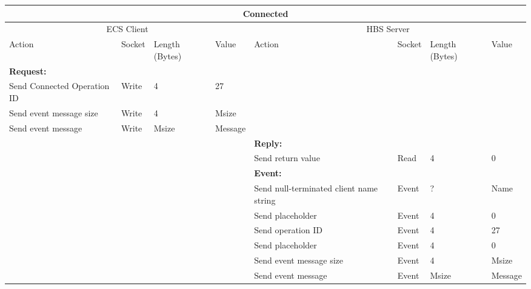 \bigskip
\small
\begin{tabular}{|p{1.2in}|p{.4in}|p{.4in}|p{.4in}|p{1.2in}|p{.4in}|p{.4in}|p{.4in} |} \hline
\multicolumn{8}{|c|}{{\bf Connected}} \\ \hline
\multicolumn{4}{|c|}{ECS Client} & \multicolumn{4}{|c|}{HBS Server} \\ \hline
Action            & Socket & Length (Bytes) 
                                   & Value & Action       & Socket & Length (Bytes) & Value \\ \hline
\multicolumn{4}{|l}{{\bf Request:}}&\multicolumn{4}{|l|}{~} \\ \hline
Send
Connected Operation ID        & Write  & 4     & 27    &              &        &       &       \\ \hline
Send event message
 size             & Write  & 4     &  Msize &         &        &       &       \\ \hline
Send event message
                  & Write  &  Msize  &  Message &     &        &       &       \\ \hline
\multicolumn{4}{|l}{~}&\multicolumn{4}{|l|}{{\bf Reply:}} \\ \hline
                  &        &       &       & Send return
                                             value        & Read   &  4    & 0      \\ \hline
\multicolumn{4}{|l}{~}&\multicolumn{4}{|l|}{{\bf Event:}} \\ \hline
                  &        &       &       & Send null-terminated client
                                             name string  & Event  &  ?    & Name  \\ \hline
                  &        &       &       & Send placeholder  & Event  &   4   &  0    \\  \hline
                  &        &       &       & Send operation 
                                             ID           & Event  &   4   &  27   \\ \hline
                  &        &       &       & Send placeholder     & Event  &   4   &  0    \\ \hline
                  &        &       &       & Send event message
                                                  size    & Event  &   4   &  Msize \\ \hline
                  &        &       &       & Send event message
                                                          & Event  &  Msize&  Message  \\ \hline
\end{tabular}
\normalsize
\bigskip


